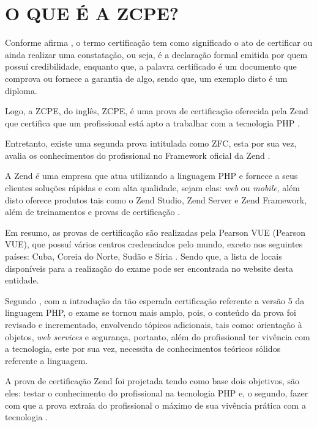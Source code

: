 \chapter{O QUE É A ZCPE?}
\label{zcpe}

Conforme afirma , o termo certificação tem como
significado o ato de certificar ou ainda realizar uma constatação, ou seja, é a
declaração formal emitida por quem possuí credibilidade, enquanto que, a palavra
certificado é um documento que comprova ou fornece a garantia de algo, sendo 
que, um exemplo disto é um diploma.

Logo, a \acs{ZCPE}, do inglês, \acl{ZCPE}, é uma prova de certificação oferecida
pela \acs{Zend} que certifica que um profissional está apto a trabalhar com a
tecnologia \acs{PHP} \cite{websiteZendZCPE}.

Entretanto, existe uma segunda prova intitulada como \ac{ZFC},
esta por sua vez, avalia os conhecimentos do profissional no
Framework oficial da \acs{Zend} \cite{websiteZendZFC}.

A \acs{Zend} é uma empresa que atua utilizando a linguagem \acs{PHP} e fornece 
a seus clientes soluções rápidas e com alta qualidade, sejam elas:  \textit{web}
ou \textit{mobile}, além disto oferece produtos tais como o \acs{Zend Studio}, 
\acs{Zend Server} e \acs{Zend Framework}, além de treinamentos e provas de
certificação \cite{websiteZendCompany}.

Em resumo, as provas de certificação são realizadas pela \acs{Pearson VUE} 
(\acl{Pearson VUE}), que possuí vários centros credenciados pelo mundo,  exceto
nos seguintes países: Cuba, Coreia do Norte, Sudão e Síria 
\cite{websiteZendZFC}. Sendo que, a lista de locais disponíveis para a 
realização do exame pode ser encontrada no website desta entidade.

Segundo , com a introdução da tão
esperada certificação referente a versão 5 da linguagem \acs{PHP}, o exame se
tornou mais amplo, pois, o conteúdo da prova foi revisado e incrementado,
envolvendo  tópicos adicionais, tais como: orientação à objetos, \textit{web
services} e segurança, portanto, além do profissional ter vivência com a 
tecnologia, este por sua vez, necessita de conhecimentos teóricos sólidos 
referente a linguagem.

A prova de certificação \acs{Zend} foi projetada tendo como base dois objetivos, são
eles: testar o conhecimento do profissional na tecnologia \acs{PHP} e, o
segundo, fazer com que a prova extraia do profissional o máximo de sua vivência 
prática com a tecnologia \cite{theZendPHPCertificationPracticeTestBook}.

